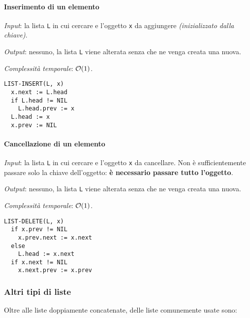 \documentclass[italian, 10pt]{article}
\begin{document}
\paragraph{Inserimento di un elemento}

\textit{Input}: la lista \texttt{L} in cui cercare e l'oggetto \texttt{x} da aggiungere \textit{(inizializzato dalla chiave)}.

\textit{Output}: nessuno, la lista \texttt{L} viene alterata senza che ne venga creata una nuova.

\textit{Complessità temporale}: \(\mathcal{O}(1)\).

\begin{lstlisting}[float, style=pseudocode, caption={Pseudocodice dell'algoritmo \texttt{LIST-INSERT}}, label={lst:list-insert}]
LIST-INSERT(L, x)
  x.next := L.head
  if L.head != NIL
    L.head.prev := x
  L.head := x
  x.prev := NIL
  \end{lstlisting}

\paragraph{Cancellazione di un elemento}

\textit{Input}: la lista \texttt{L} in cui cercare e l'oggetto \texttt{x} da cancellare.
Non è sufficientemente passare solo la chiave dell'oggetto: \textbf{è necessario passare tutto l'oggetto}.

\textit{Output}: nessuno, la lista \texttt{L} viene alterata senza che ne venga creata una nuova.

\textit{Complessità temporale}: \(\mathcal{O}(1)\).

\begin{lstlisting}[float, style=pseudocode, caption={Pseudocodice dell'algoritmo \texttt{LIST-DELETE}}, label={lst:list-delete}]
LIST-DELETE(L, x)
  if x.prev != NIL
    x.prev.next := x.next
  else
    L.head := x.next
  if x.next != NIL
    x.next.prev := x.prev
  \end{lstlisting}

\subsubsection{Altri tipi di liste}

Oltre alle liste doppiamente concatenate, delle liste comunemente usate sono:
\end{document}
